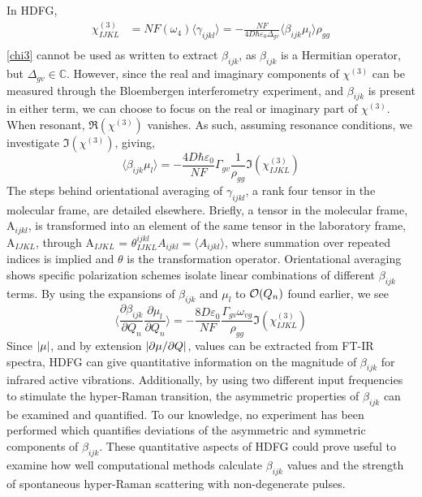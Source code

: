\documentclass[aip, jcp, reprint, onecolumn]{revtex4-2}
\begin{document}
In HDFG, 
\begin{equation}\label{chi3}
\begin{split}
		\chi^{(3)}_{IJKL} &= NF(\omega_4) \langle \gamma_{ijkl} \rangle = -\frac{NF}{4D \hbar \varepsilon_0 \Delta_{gv}} \langle \beta_{ijk} \mu_l \rangle \rho_{gg}\\
\end{split}
\end{equation}
\autoref{chi3} cannot be used as written to extract $\beta_{ijk}$, as $\beta_{ijk}$ is a Hermitian operator, but $\Delta_{gv} \in \mathbb{C}$. 
However, since the real and imaginary components of $\chi^{(3)}$ can be measured through the Bloembergen interferometry experiment, and $\beta_{ijk}$ is present in either term, we can choose to focus on the real or imaginary part of $\chi^{(3)}$.
When resonant, $\Re(\chi^{(3)})$ vanishes.
As such, assuming resonance conditions, we investigate $\Im(\chi^{(3)})$, giving, 
\begin{equation}
	\langle \beta_{ijk} \mu_{l} \rangle = -\frac{4D \hbar \varepsilon_0}{NF} \Gamma_{gv} \frac{1}{\rho_{gg}} \Im(\chi^{(3)}_{IJKL})
\end{equation}
The steps behind orientational averaging of $\gamma_{ijkl}$, a rank four tensor in the molecular frame, are detailed elsewhere.\cite{Andrews1977, McDonnell2024}
Briefly, a tensor in the molecular frame, A$_{ijkl}$, is transformed into an element of the same tensor in the laboratory frame, A$_{IJKL}$, through A$_{IJKL}$ = $\theta^{ijkl}_{IJKL} A_{ijkl} = \langle A_{ijkl} \rangle$, where summation over repeated indices is implied and $\theta$ is the transformation operator. \cite{McDonnell2024}
Orientational averaging shows specific polarization schemes isolate linear combinations of different $\beta_{ijk}$ terms. \cite{Bersohn1966, Willetts1992, Kauranen1996}
By using the expansions of $\beta_{ijk}$ and $\mu_{l}$ to $\order{Q_n}$ found earlier, we see
\begin{equation}\label{betasive}
	\langle \frac{\partial \beta_{ijk}}{\partial Q_n} {\frac{\partial \mu_l}{\partial Q_n}} \rangle = -\frac{8D \varepsilon_0}{NF}  \frac{\Gamma_{gv} \omega_{vg}}{\rho_{gg}} {\Im(\chi^{(3)}_{IJKL})}
\end{equation}
Since $\abs{\mu}$, and by extension $\abs{\partial \mu / \partial Q}$, values can be extracted from FT-IR spectra, HDFG can give quantitative information on the magnitude of $\beta_{ijk}$ for infrared active vibrations.
Additionally, by using two different input frequencies to stimulate the hyper-Raman transition, the asymmetric properties of $\beta_{ijk}$ can be examined and quantified. \cite{Christie1971, Denisov1986, Kozich2007}
To our knowledge, no experiment has been performed which quantifies deviations of the asymmetric and symmetric components of $\beta_{ijk}$. 
These quantitative aspects of HDFG could prove useful to examine how well computational methods calculate $\beta_{ijk}$ values and the strength of spontaneous hyper-Raman scattering with non-degenerate pulses.
\end{document}

